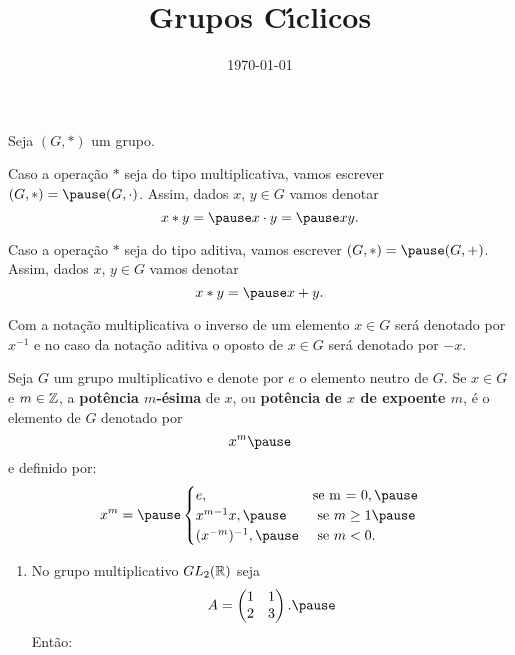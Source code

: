 \documentclass{beamer}
\title{Grupos C{\'\i}clicos}
\author[\autor]{\autor}
\institute[\instituto]{\instituto}
\date{\today}
\begin{document}
    \begin{frame}
        \maketitle
    \end{frame}


    \begin{frame}
        Seja $(G, *)$ um grupo. \pause

        Caso a opera\c{c}\~ao $*$ seja do tipo multiplicativa, vamos escrever $(G, *) = \pause (G, \cdot)$. \pause Assim, dados $x$, $y \in G$ vamos denotar\pause
        \[
            x * y = \pause x \cdot y = \pause xy.
        \]

        Caso a opera\c{c}\~ao $*$ seja do tipo aditiva, vamos escrever $(G, *) = \pause (G, +)$. \pause Assim, dados $x$, $y \in G$ vamos denotar\pause
        \[
            x * y = \pause x + y.
        \]

        Com a nota\c{c}\~ao multiplicativa \pause o inverso de um elemento $x \in G$ \pause ser\'a denotado por $x^{-1}$ \pause e no caso da nota\c{c}\~ao aditiva \pause o oposto de $x \in G$ \pause ser\'a denotado por $-x$.
    \end{frame}

    \begin{frame}
        Seja $G$ um grupo multiplicativo \pause e denote por $e$ o elemento neutro de $G$. \pause Se $x \in G$ \pause e $m \in \mathbb{Z}$, \pause a \textbf{pot\^encia $m$-\'esima} de $x$, \pause ou \textbf{pot\^encia de $x$ de expoente $m$}, \pause \'e o elemento de $G$ denotado por \pause
        \[
            x^m \pause
        \]
        e definido por: \pause
        \[
            x^m = \pause \begin{cases}
                    e, & \mbox{se m = 0}, \pause\\
                    x^{m-1}x, \pause & \mbox{ se } m \ge 1 \pause\\
                    (x^{-m})^{-1}, \pause & \mbox{ se } m < 0. 
                   \end{cases}
        \]
        
    \end{frame}

    \begin{frame}
        \begin{exemplos}
            \begin{enumerate}[label={\roman*})]
                \item No grupo multiplicativo $GL_2(\mathbb{R})$ \pause seja \pause
                \[
                    A = \begin{pmatrix}
                        1 & 1\\2 & 3
                    \end{pmatrix}. \pause
                \]
                Ent\~ao:
                \seti
            \end{enumerate}
        \end{exemplos}
    \end{frame}
    
\end{document}
